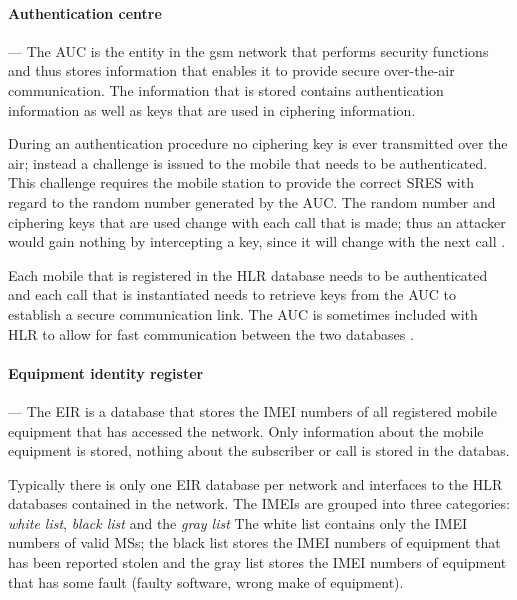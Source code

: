 \paragraph{Authentication centre}
--- The AUC is the entity in the \gls{gsm} network that performs security functions and thus stores information that enables it to provide secure over-the-air communication\cite{GSM92,GSMSysEngin}. The information that is stored contains authentication information as well as keys that are used in ciphering information\cite{GSM92,GSMSysEngin}.

During an authentication procedure no ciphering key is ever transmitted over the air; instead a challenge is issued to the mobile that needs to be authenticated. This challenge requires the mobile station to provide the correct \gls{SRES} with regard to the random number generated by the \gls{AUC}\cite{GSM92,GSMSysEngin}. The random number and ciphering keys that are used change with each call that is made; thus an attacker would gain nothing by intercepting a key, since it will change with the next call \cite{GSMSysEngin}.

Each mobile that is registered in the \gls{HLR} database needs to be authenticated and each call that is instantiated needs to retrieve keys from the AUC to establish a secure communication link\cite{GSM92,GSMSysEngin}. The AUC is sometimes included with \gls{HLR} to allow for fast communication between the two databases \cite{GSMSysEngin}.

\paragraph{Equipment identity register}
--- The \gls{EIR} is a database that stores the \gls{IMEI} numbers of all registered mobile equipment that has accessed the network\cite{GSMSysEngin}. Only information about the mobile equipment is stored, nothing about the subscriber or call is stored in the databas\cite{GSMSysEngin}.

Typically there is only one \gls{EIR} database per network and interfaces to the \gls{HLR} databases contained in the network\cite{GSMSysEngin}. The \glspl{IMEI} are grouped into three categories: \emph{white list}, \emph{black list} and the \emph{gray list}\cite{GSMSysEngin} The white list contains only the \gls{IMEI} numbers of valid \glspl{MS}; the black list stores the \gls{IMEI} numbers of equipment that has been reported stolen and the gray list stores the \gls{IMEI} numbers of equipment that has some fault (faulty software, wrong make of equipment)\cite{GSMSysEngin}.

